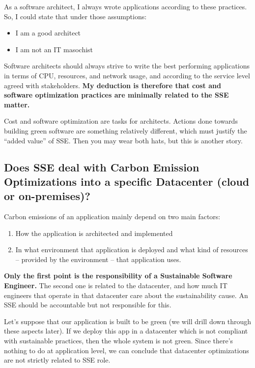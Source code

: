 \documentclass{article}
\begin{document}
\vspace{\baselineskip}
As a software architect, I always wrote applications according to these practices. So, I could state that under those assumptions:

\begin{itemize}
    \item I am a good architect
    \item I am not an IT masochist
\end{itemize}

Software architects should always strive to write the best performing applications in terms of CPU, resources, and network usage, and according to the service level agreed with stakeholders. \textbf{My deduction is therefore that cost and software optimization practices are minimally related to the SSE matter.}

\vspace{\baselineskip}
Cost and software optimization are tasks for architects. Actions done towards building green software are something relatively different, which must justify the “added value” of SSE. Then you may wear both hats, but this is another story.

\subsection*{Does SSE deal with Carbon Emission Optimizations into a specific Datacenter (cloud or on-premises)?}

Carbon emissions of an application mainly depend on two main factors:

\begin{enumerate}
    \item How the application is architected and implemented
    \item In what environment that application is deployed and what kind of resources – provided by the environment – that application uses.
\end{enumerate}

\textbf{Only the first point is the responsibility of a Sustainable Software Engineer.} The second one is related to the datacenter, and how much IT engineers that operate in that datacenter care about the sustainability cause. An SSE should be accountable but not responsible for this.

Let’s suppose that our application is built to be green (we will drill down through these aspects later). If we deploy this app in a datacenter which is not compliant with sustainable practices, then the whole system is not green. Since there’s nothing to do at application level, we can conclude that datacenter optimizations are not strictly related to SSE role.
\end{document}
